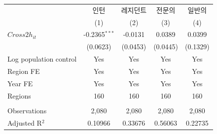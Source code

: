 \begingroup
\centering
\begin{tabular}{lcccc}
   \toprule
                          & 인턴            & 레지던트 & 전문의   & 일반의 \\   
                          & (1)             & (2)      & (3)      & (4)\\  
   \midrule 
   $Cross2h_{it}$         & -0.2365$^{***}$ & -0.0131  & 0.0389   & 0.0399\\   
                          & (0.0623)        & (0.0453) & (0.0445) & (0.1329)\\   
   Log population control & Yes             & Yes      & Yes      & Yes\\  
   Region FE              & Yes             & Yes      & Yes      & Yes\\  
   Year FE                & Yes             & Yes      & Yes      & Yes\\  
   Regions                & 160             & 160      & 160      & 160\\  
    \\
   Observations           & 2,080           & 2,080    & 2,080    & 2,080\\  
   Adjusted R$^2$         & 0.10966         & 0.33676  & 0.56063  & 0.22735\\  
   \bottomrule
\end{tabular}
\par\endgroup
